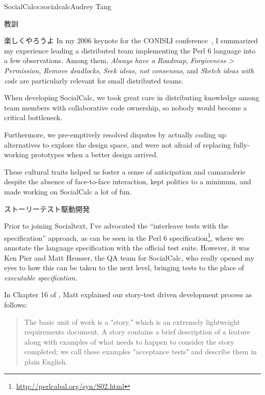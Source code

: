 \begin{aosachapter}{SocialCalc}{s:socialcalc}{Audrey Tang}
\begin{aosasect1}{教訓}
\begin{aosasect2}{楽しくやろうよ}
In my 2006 keynote for the CONISLI conference~\cite{bib:tang:fun}, I
summarized my experience leading a distributed team implementing the
Perl 6 language into a few observations.  Among them, \emph{Always
 have a Roadmap}, \emph{Forgiveness {\textgreater} Permission},
\emph{Remove deadlocks}, \emph{Seek ideas, not consensus}, and
\emph{Sketch ideas with code} are particularly relevant for small
distributed teams.

When developing SocialCalc, we took great care in distributing
knowledge among team members with collaborative code ownership, so
nobody would become a critical bottleneck.

Furthermore, we pre-emptively resolved disputes by actually coding up
alternatives to explore the design space, and were not afraid of
replacing fully-working prototypes when a better design arrived.

These cultural traits helped us foster a sense of anticipation and
camaraderie despite the absence of face-to-face interaction, kept
politics to a minimum, and made working on SocialCalc a lot of fun.

\end{aosasect2}

\begin{aosasect2}{ストーリーテスト駆動開発}

Prior to joining Socialtext, I've advocated the ``interleave tests
with the specification'' approach, as can be seen in the Perl 6
specification\footnote{\url{http://perlcabal.org/syn/S02.html}}, where
we annotate the language specification with the official test suite.
However, it was Ken Pier and Matt Heusser, the QA team for SocialCalc,
who really opened my eyes to how this can be taken to the next level,
bringing tests to the place of \emph{executable specification}.


In Chapter 16 of \cite{bib:goucher:test}, Matt explained our
story-test driven development process as follows:

\begin{quotation}

  The basic unit of work is a "story," which is an extremely
  lightweight requirements document. A story contains a brief
  description of a feature along with examples of what needs to happen
  to consider the story completed; we call these examples "acceptance
  tests" and describe them in plain English.


\end{quotation}
\end{aosasect2}
\end{aosasect1}
\end{aosachapter}

